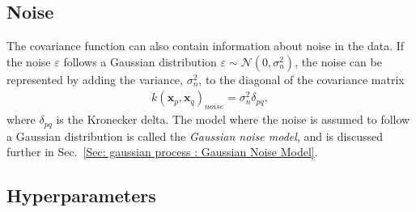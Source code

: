 \documentclass[twoside,english]{uiofysmaster}
\begin{document}
{{%


\subsection{Noise}\label{Sec:: gaussian process : Noise Covariance Function}


The covariance function can also contain information about noise in the data. If the noise $\varepsilon$ follows a Gaussian distribution $\varepsilon \sim \mathcal{N}(0, \sigma_n^2)$, the noise can be represented by adding the variance, $\sigma_n^2$, to the diagonal of the covariance matrix
\begin{align}
k(\textbf{x}_p, \textbf{x}_q)_{noise} = \sigma^2_n \delta_{pq},
\end{align}
where $\delta_{pq}$ is the Kronecker delta. The model where the noise is assumed to follow a Gaussian distribution is called the \textit{Gaussian noise model}, and is discussed further in Sec.~\ref{Sec: gaussian process : Gaussian Noise Model}. %

\subsection{Hyperparameters}\label{Sec:: gaussian process : Hyperparameters}

}}
\end{document}
